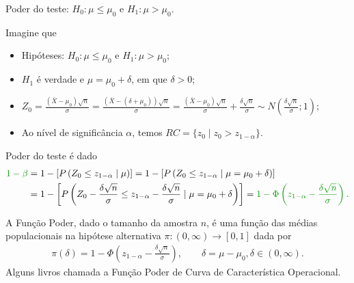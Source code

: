 \documentclass[8pt]{beamer}
\begin{document}
\begin{frame}{Poder do teste: $H_0:\mu \leq \mu_0$ e $H_1: \mu > \mu_0$.}

\normalsize

Imagine que
\begin{itemize}
	\item Hipóteses: $H_0: \mu \leq \mu_0$ e $H_1: \mu > \mu_0$;
	\item $H_1$ é verdade e $\mu = \mu_0 + \delta$, em que $\delta > 0$;
	\item $Z_0 = \frac{(\bar{X} - \mu_0)\sqrt{n}}{\sigma} = \frac{(\bar{X} - (\delta + \mu_0))\sqrt{n}}{\sigma} = \frac{(\bar{X} - \mu_0)\sqrt{n}}{\sigma} + \frac{\delta\sqrt{n}}{\sigma} \sim N\left( \frac{\delta \sqrt{n}}{\sigma}; 1 \right)$;
	\item Ao nível de significância $\alpha$, temos $RC = \{ z_0 \mid z_0 > z_{1-\alpha}   \}$.
\end{itemize}
\vfill	

Poder do teste é dado
\begin{align*}
\textcolor{important}{1-\beta} &=1 - \left[P\left( Z_0 \leq z_{1 - \alpha} \mid \mu \right)\right] = 1- \left[ P \left( Z_0 \leq z_{1 - \alpha} \mid \mu = \mu_0 + \delta \right)\right]\\
&= 1- \left[ P \left( Z_0 - \frac{\delta \sqrt{n}}{\sigma} \leq z_{1 - \alpha} - \frac{\delta \sqrt{n}}{\sigma} \mid \mu = \mu_0 + \delta \right)\right]= \textcolor{important}{1 - \Phi\left( z_{1 - \alpha} - \frac{\delta \sqrt{n}}{\sigma} \right).}
\end{align*}
\vfill

A \textcolor{important}{Função Poder}, dado o tamanho da amostra $n$, é uma função das médias populacionais na hipótese alternativa  $\pi: (0, \infty) \longrightarrow [0,1]$ dada por
\begin{align*}
\pi(\delta) = 1 - \Phi\left( z_{1 - \alpha} - \frac{\delta \sqrt{n}}{\sigma} \right), \qquad \delta = \mu - \mu_0, \delta \in (0, \infty).
\end{align*}
Alguns livros chamada a Função Poder de \textcolor{important}{Curva de Característica Operacional.}

\normalsize	
\end{frame}
\end{document}
